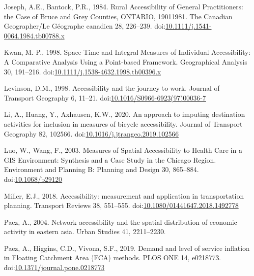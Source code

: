 \documentclass[]{elsarticle} %
\newlength{\cslhangindent}
\newlength{\cslentryspacingunit} %
\newenvironment{CSLReferences}[2] %
 {%
  \setlength{\parindent}{0pt}
  \ifodd #1
  \let\oldpar\par
  \def\par{\hangindent=\cslhangindent\oldpar}
  \fi
  \setlength{\parskip}{#2\cslentryspacingunit}
 }%
 {}
\begin{document}
\begin{CSLReferences}{1}{0}
\leavevmode{}%
Joseph, A.E., Bantock, P.R., 1984. Rural Accessibility of General
Practitioners: the Case of Bruce and Grey Counties, ONTARIO,
1901{\textendash}1981. The Canadian Geographer/Le Géographe canadien 28,
226--239.
doi:\href{https://doi.org/10.1111/j.1541-0064.1984.tb00788.x}{10.1111/j.1541-0064.1984.tb00788.x}

\leavevmode{}%
Kwan, M.-P., 1998. Space-{Time} and {Integral} {Measures} of
{Individual} {Accessibility}: {A} {Comparative} {Analysis} {Using} a
{Point}-based {Framework}. Geographical Analysis 30, 191--216.
doi:\href{https://doi.org/10.1111/j.1538-4632.1998.tb00396.x}{10.1111/j.1538-4632.1998.tb00396.x}

\leavevmode{}%
Levinson, D.M., 1998. Accessibility and the journey to work. Journal of
Transport Geography 6, 11--21.
doi:\href{https://doi.org/10.1016/S0966-6923(97)00036-7}{10.1016/S0966-6923(97)00036-7}

\leavevmode{}%
Li, A., Huang, Y., Axhausen, K.W., 2020. An approach to imputing
destination activities for inclusion in measures of bicycle
accessibility. Journal of Transport Geography 82, 102566.
doi:\href{https://doi.org/10.1016/j.jtrangeo.2019.102566}{10.1016/j.jtrangeo.2019.102566}

\leavevmode{}%
Luo, W., Wang, F., 2003. Measures of Spatial Accessibility to Health
Care in a GIS Environment: Synthesis and a Case Study in the Chicago
Region. Environment and Planning B: Planning and Design 30, 865--884.
doi:\href{https://doi.org/10.1068/b29120}{10.1068/b29120}

\leavevmode{}%
Miller, E.J., 2018. Accessibility: measurement and application in
transportation planning. Transport Reviews 38, 551--555.
doi:\href{https://doi.org/10.1080/01441647.2018.1492778}{10.1080/01441647.2018.1492778}

\leavevmode{}%
Paez, A., 2004. Network accessibility and the spatial distribution of
economic activity in eastern asia. Urban Studies 41, 2211--2230.

\leavevmode{}%
Paez, A., Higgins, C.D., Vivona, S.F., 2019. Demand and level of service
inflation in Floating Catchment Area (FCA) methods. PLOS ONE 14,
e0218773.
doi:\href{https://doi.org/10.1371/journal.pone.0218773}{10.1371/journal.pone.0218773}


\end{CSLReferences}
\end{document}
